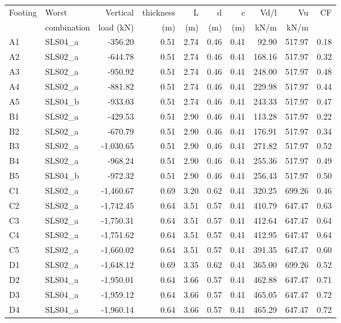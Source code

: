 \begin{center}
  \begin{tabular}{|l|l|r|r|r|r|r|r|r|r|}
\hline
Footing & Worst & Vertical & thickness & L & d & c & Vd/l & Vu & CF\\
 & combination & load (kN) & (m) & (m) & (m) & (m) & kN/m & kN/m & \\
\hline
 A1 &  SLS04\_a & -356.20 & 0.51 & 2.74 & 0.46 & 0.41 & 92.90 & 517.97 & 0.18\\
 A2 &  SLS02\_a & -644.78 & 0.51 & 2.74 & 0.46 & 0.41 & 168.16 & 517.97 & 0.32\\
 A3 &  SLS02\_a & -950.92 & 0.51 & 2.74 & 0.46 & 0.41 & 248.00 & 517.97 & 0.48\\
 A4 &  SLS02\_a & -881.82 & 0.51 & 2.74 & 0.46 & 0.41 & 229.98 & 517.97 & 0.44\\
 A5 &  SLS04\_b & -933.03 & 0.51 & 2.74 & 0.46 & 0.41 & 243.33 & 517.97 & 0.47\\
 B1 &  SLS02\_a & -429.53 & 0.51 & 2.90 & 0.46 & 0.41 & 113.28 & 517.97 & 0.22\\
 B2 &  SLS02\_a & -670.79 & 0.51 & 2.90 & 0.46 & 0.41 & 176.91 & 517.97 & 0.34\\
 B3 &  SLS02\_a & -1,030.65 & 0.51 & 2.90 & 0.46 & 0.41 & 271.82 & 517.97 & 0.52\\
 B4 &  SLS02\_a & -968.24 & 0.51 & 2.90 & 0.46 & 0.41 & 255.36 & 517.97 & 0.49\\
 B5 &  SLS04\_b & -972.32 & 0.51 & 2.90 & 0.46 & 0.41 & 256.43 & 517.97 & 0.50\\
 C1 &  SLS02\_a & -1,460.67 & 0.69 & 3.20 & 0.62 & 0.41 & 320.25 & 699.26 & 0.46\\
 C2 &  SLS02\_a & -1,742.45 & 0.64 & 3.51 & 0.57 & 0.41 & 410.79 & 647.47 & 0.63\\
 C3 &  SLS02\_a & -1,750.31 & 0.64 & 3.51 & 0.57 & 0.41 & 412.64 & 647.47 & 0.64\\
 C4 &  SLS02\_a & -1,751.62 & 0.64 & 3.51 & 0.57 & 0.41 & 412.95 & 647.47 & 0.64\\
 C5 &  SLS02\_a & -1,660.02 & 0.64 & 3.51 & 0.57 & 0.41 & 391.35 & 647.47 & 0.60\\
 D1 &  SLS02\_a & -1,648.12 & 0.69 & 3.35 & 0.62 & 0.41 & 365.00 & 699.26 & 0.52\\
 D2 &  SLS04\_a & -1,950.01 & 0.64 & 3.66 & 0.57 & 0.41 & 462.88 & 647.47 & 0.71\\
 D3 &  SLS04\_a & -1,959.12 & 0.64 & 3.66 & 0.57 & 0.41 & 465.05 & 647.47 & 0.72\\
 D4 &  SLS04\_a & -1,960.14 & 0.64 & 3.66 & 0.57 & 0.41 & 465.29 & 647.47 & 0.72\\

\end{tabular}
\end{center}
